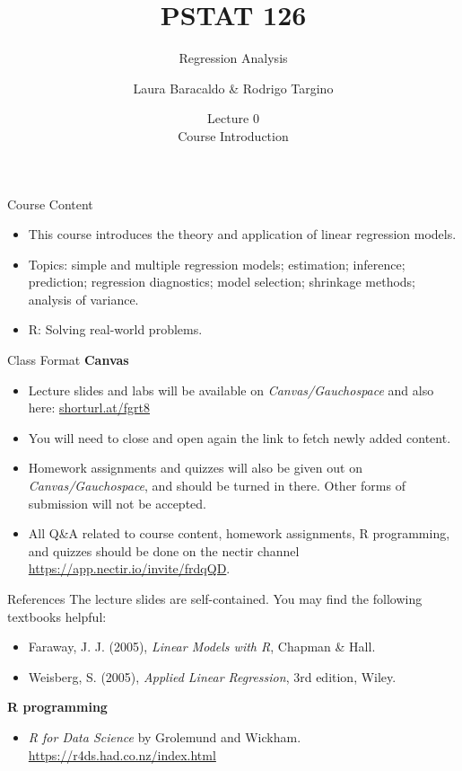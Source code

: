 \documentclass[10pt]{beamer}
\title[PSTAT 126: Regression Analysis]{PSTAT 126}%
\subtitle{Regression Analysis }%
\author[Laura Baracaldo \& Rodrigo Targino]{Laura Baracaldo \& Rodrigo Targino}%
\institute[UCSB]{}
\date[\textcolor{white}{Lecure 0: Course Introduction}]
{Lecture 0\\
Course Introduction}
\begin{document}
\frame{\titlepage}






\begin{frame}{Course Content}

\begin{itemize}
\large
    \item This course introduces the theory and application of linear regression models. 
    \item Topics: simple and multiple regression models; estimation; inference; prediction; regression diagnostics; model selection; shrinkage methods; analysis of variance. \item R: Solving real-world problems.
\end{itemize}

\end{frame}



\begin{frame}{Class Format}
\large
{\bf Canvas}
\begin{itemize}

\item Lecture slides and labs will be available on {\em Canvas/Gauchospace} and also here:
\url{shorturl.at/fgrt8}
\item You will need to close and open again the link to fetch newly added content.
\item Homework assignments and quizzes will also be given out on {\em Canvas/Gauchospace}, and should be turned in there. Other forms of submission will not be accepted.
\item All Q\&A related to course content, homework assignments, R programming, and quizzes should
be done on the nectir channel \url{https://app.nectir.io/invite/frdqQD}.
\end{itemize}
\end{frame}

\begin{frame}{References}
\large
 The lecture slides are self-contained. You may find the following textbooks helpful:

\begin{itemize}
\item Faraway, J. J. (2005),\textit{ Linear Models with R}, Chapman \& Hall.
\item Weisberg, S. (2005),\textit{ Applied Linear Regression}, 3rd edition, Wiley.
\end{itemize}  

\vspace{0.05in}

{\bf R programming}
\begin{itemize}
\item \textit{R for Data Science} by Grolemund and Wickham.    \url{ https://r4ds.had.co.nz/index.html}
\end{itemize}
\end{frame}
\end{document}
